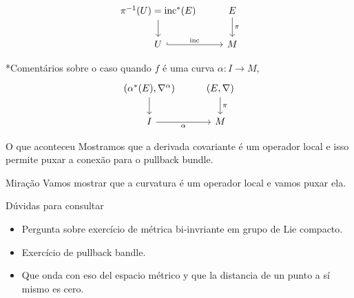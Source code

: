 \begin{example}\leavevmode
\[\begin{tikzcd}
	\pi^{-1}(U)=\text{inc}^* (E)\arrow[d]&E\arrow[d,"\pi"]\\
	U\arrow[r,hook,"\text{inc}"]&M
\end{tikzcd}\]
\end{example}
\begin{remark}\leavevmode
*Comentários sobre o caso quando \(f\) é uma curva \(\alpha:I \to M\),
\[\begin{tikzcd}
	(\alpha ^* (E),\nabla^\alpha)\arrow[d]& (E,\nabla)\arrow[d,"\pi"]\\I\arrow[r,"\alpha",swap]&M
\end{tikzcd}\]
\end{remark}

\begin{thing8}{O que aconteceu}\leavevmode
Mostramos que a derivada covariante é um operador local e isso permite puxar a conexão para o pullback bundle.
\end{thing8}

\begin{thing9}{Miração}\leavevmode
Vamos mostrar que a curvatura é um operador local e vamos puxar ela.
\end{thing9}

\begin{thing8}{Dúvidas para consultar}\leavevmode
\begin{itemize}
\item Pergunta sobre exercício de métrica bi-invriante em grupo de Lie compacto.
\item Exercício de pullback bandle.
\item Que onda con eso del espacio métrico y que la distancia de un punto a sí mismo es cero.
\end{itemize}
\end{thing8}

\clearpage
